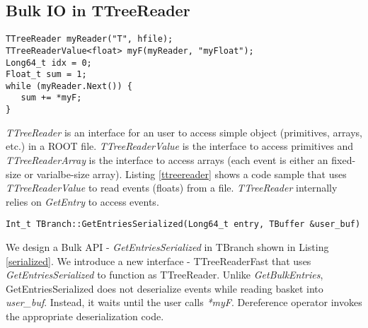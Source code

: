 \subsection{Bulk IO in TTreeReader}

\begin{lstlisting}[label={ttreereader}]
TTreeReader myReader("T", hfile);
TTreeReaderValue<float> myF(myReader, "myFloat");
Long64_t idx = 0; 
Float_t sum = 1; 
while (myReader.Next()) { 
   sum += *myF;
}
\end{lstlisting}
\vspace{-10pt}


\textit{TTreeReader} is an interface for an user to access simple object (primitives, arrays, etc.) in a ROOT file. \textit{TTreeReaderValue} is the interface to access primitives and \textit{TTreeReaderArray} is the interface to access arrays (each event is either an fixed-size or varialbe-size array). Listing \ref{ttreereader} shows a code sample that uses \textit{TTreeReaderValue} to read events (floats) from a file. \textit{TTreeReader} internally relies on \textit{GetEntry} to access events.

\lstset{
  basicstyle=\footnotesize\ttfamily, frame=single,
  xleftmargin=0\textwidth,
  xrightmargin=0\textwidth
}
\begin{lstlisting}[label={serialized}]
Int_t TBranch::GetEntriesSerialized(Long64_t entry, TBuffer &user_buf)
\end{lstlisting}
\vspace{-10pt}


We design a Bulk API - \textit{GetEntriesSerialized} in TBranch shown in Listing \ref{serialized}. We introduce a new interface - TTreeReaderFast that uses \textit{GetEntriesSerialized} to function as TTreeReader. Unlike \textit{GetBulkEntries}, GetEntriesSerialized does not deserialize events while reading basket into \textit{user\_buf}. Instead, it waits until the user calls \textit{*myF}. Dereference operator invokes the appropriate deserialization code. 

